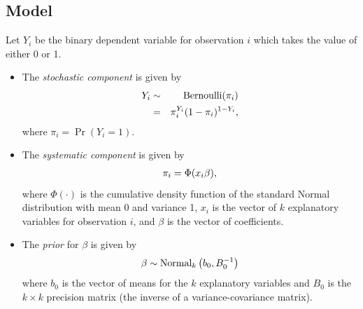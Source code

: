 \documentclass[letterpaper,10pt,english]{sphinxmanual}
\begin{document}
\subsection{Model}
\label{vignette:id113}
Let \(Y_{i}\) be the binary dependent variable for observation
\(i\) which takes the value of either 0 or 1.
\begin{itemize}
\item {} 
The \emph{stochastic component} is given by
\begin{gather}
\begin{split}\begin{aligned}
Y_{i}  &  \sim & \textrm{Bernoulli}(\pi_{i})\\
&  = & \pi_{i}^{Y_{i}}(1-\pi_{i})^{1-Y_{i}},\end{aligned}\end{split}\notag
\end{gather}
where \(\pi_{i}=\Pr(Y_{i}=1)\).

\item {} 
The \emph{systematic component} is given by
\begin{gather}
\begin{split}\begin{aligned}
\pi_{i}= \Phi(x_i \beta),\end{aligned}\end{split}\notag
\end{gather}
where \(\Phi(\cdot)\) is the cumulative density function of the
standard Normal distribution with mean 0 and variance 1,
\(x_{i}\) is the vector of \(k\) explanatory variables for
observation \(i\), and \(\beta\) is the vector of
coefficients.

\item {} 
The \emph{prior} for \(\beta\) is given by
\begin{gather}
\begin{split}\begin{aligned}
\beta \sim \textrm{Normal}_k \left(  b_{0}, B_{0}^{-1} \right)\end{aligned}\end{split}\notag
\end{gather}
where \(b_{0}\) is the vector of means for the \(k\)
explanatory variables and \(B_{0}\) is the \(k \times k\)
precision matrix (the inverse of a variance-covariance matrix).

\end{itemize}
\end{document}
